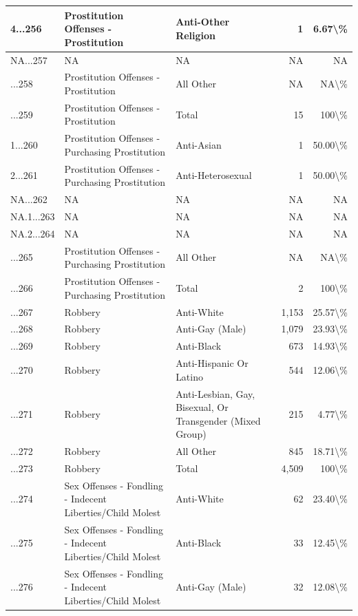 \documentclass[
]{krantz}
\begin{document}
\begin{longtable}[t]{l|l|l|r|r}
\hline
4...256 & Prostitution Offenses - Prostitution & Anti-Other Religion & 1 & 6.67\textbackslash{}\%\\
\hline
NA...257 & NA & NA & NA & NA\\
\hline
...258 & Prostitution Offenses - Prostitution & All Other & NA & NA\textbackslash{}\%\\
\hline
...259 & Prostitution Offenses - Prostitution & Total & 15 & 100\textbackslash{}\%\\
\hline
1...260 & Prostitution Offenses - Purchasing Prostitution & Anti-Asian & 1 & 50.00\textbackslash{}\%\\
\hline
2...261 & Prostitution Offenses - Purchasing Prostitution & Anti-Heterosexual & 1 & 50.00\textbackslash{}\%\\
\hline
NA...262 & NA & NA & NA & NA\\
\hline
NA.1...263 & NA & NA & NA & NA\\
\hline
NA.2...264 & NA & NA & NA & NA\\
\hline
...265 & Prostitution Offenses - Purchasing Prostitution & All Other & NA & NA\textbackslash{}\%\\
\hline
...266 & Prostitution Offenses - Purchasing Prostitution & Total & 2 & 100\textbackslash{}\%\\
\hline
...267 & Robbery & Anti-White & 1,153 & 25.57\textbackslash{}\%\\
\hline
...268 & Robbery & Anti-Gay (Male) & 1,079 & 23.93\textbackslash{}\%\\
\hline
...269 & Robbery & Anti-Black & 673 & 14.93\textbackslash{}\%\\
\hline
...270 & Robbery & Anti-Hispanic Or Latino & 544 & 12.06\textbackslash{}\%\\
\hline
...271 & Robbery & Anti-Lesbian, Gay, Bisexual, Or Transgender (Mixed Group) & 215 & 4.77\textbackslash{}\%\\
\hline
...272 & Robbery & All Other & 845 & 18.71\textbackslash{}\%\\
\hline
...273 & Robbery & Total & 4,509 & 100\textbackslash{}\%\\
\hline
...274 & Sex Offenses - Fondling - Indecent Liberties/Child Molest & Anti-White & 62 & 23.40\textbackslash{}\%\\
\hline
...275 & Sex Offenses - Fondling - Indecent Liberties/Child Molest & Anti-Black & 33 & 12.45\textbackslash{}\%\\
\hline
...276 & Sex Offenses - Fondling - Indecent Liberties/Child Molest & Anti-Gay (Male) & 32 & 12.08\textbackslash{}\%\\

\end{longtable}
\end{document}
